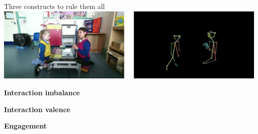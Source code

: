 \documentclass[compress]{beamer}
\begin{document}

\begin{frame}{Three constructs to rule them all}
        \centering
        \includegraphics[width=0.9\linewidth]{kinematics_social_dynamics/clips.jpg}

    \textbf{Interaction imbalance}
    
    \textbf{Interaction valence}
    
    \textbf{Engagement}

\end{frame}



\end{document}
